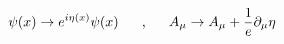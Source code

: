 \begin{equation}
\psi(x)\rightarrow e^{i\eta(x)}\psi(x)\makebox[.5in]{,}
A_\mu\rightarrow A_\mu + \frac{1}{e} \partial_\mu \eta
\end{equation}

